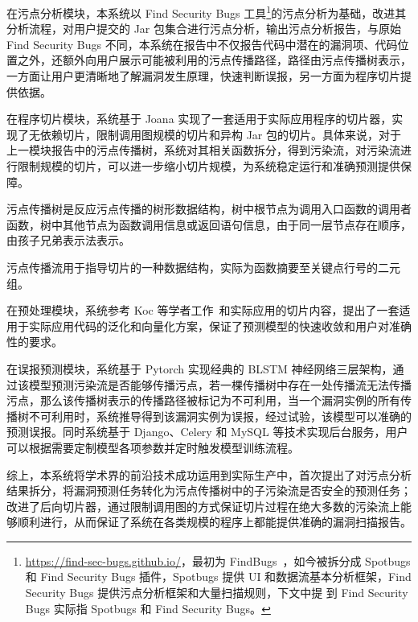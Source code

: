 在污点分析模块，本系统以 Find Security Bugs  工具\footnote{\url{https://find-sec-bugs.github.io/}，最初为 FindBugs~\cite{taint:finding}，如今被拆分成 Spotbugs 和 Find Security Bugs 插件，Spotbugs 提供 UI 和数据流基本分析框架，Find Security Bugs 提供污点分析框架和大量扫描规则，下文中提 到 Find Security Bugs 实际指 Spotbugs 和 Find Security Bugs。}的污点分析为基础，改进其分析流程，对用户提交的 Jar 包集合进行污点分析，输出污点分析报告，与原始 Find Security Bugs 不同，本系统在报告中不仅报告代码中潜在的漏洞项、代码位置之外，还额外向用户展示可能被利用的污点传播路径，路径由污点传播树表示，一方面让用户更清晰地了解漏洞发生原理，快速判断误报，另一方面为程序切片提供依据。

在程序切片模块，系统基于 Joana 实现了一套适用于实际应用程序的切片器，实现了无依赖切片，限制调用图规模的切片和异构 Jar 包的切片。具体来说，对于上一模块报告中的污点传播树，系统对其相关函数拆分，得到污染流，对污染流进行限制规模的切片，可以进一步缩小切片规模，为系统稳定运行和准确预测提供保障。

\begin{definition}[污点传播树]
    污点传播树是反应污点传播的树形数据结构，树中根节点为调用入口函数的调用者函数，树中其他节点为函数调用信息或返回语句信息，由于同一层节点存在顺序，由孩子兄弟表示法表示。
\end{definition}

\begin{definition}[污点传播流]
    污点传播流用于指导切片的一种数据结构，实际为函数摘要至关键点行号的二元组。
\end{definition}

在预处理模块，系统参考 Koc 等学者工作~\cite{Koc2019}和实际应用的切片内容，提出了一套适用于实际应用代码的泛化和向量化方案，保证了预测模型的快速收敛和用户对准确性的要求。

在误报预测模块，系统基于 Pytorch 实现经典的 BLSTM 神经网络三层架构，通过该模型预测污染流是否能够传播污点，若一棵传播树中存在一处传播流无法传播污点，那么该传播树表示的传播路径被标记为不可利用，当一个漏洞实例的所有传播树不可利用时，系统推导得到该漏洞实例为误报，经过试验，该模型可以准确的预测误报。同时系统基于 Django、Celery 和 MySQL 等技术实现后台服务，用户可以根据需要定制模型各项参数并定时触发模型训练流程。

综上，本系统将学术界的前沿技术成功运用到实际生产中，首次提出了对污点分析结果拆分，将漏洞预测任务转化为污点传播树中的子污染流是否安全的预测任务；改进了后向切片器，通过限制调用图的方式保证切片过程在绝大多数的污染流上能够顺利进行，从而保证了系统在各类规模的程序上都能提供准确的漏洞扫描报告。

